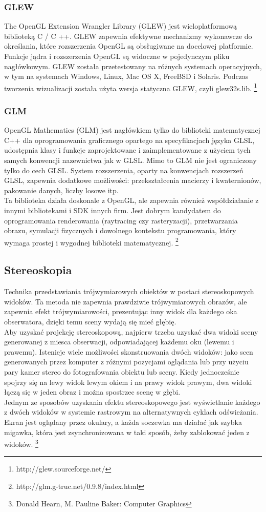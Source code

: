 \documentclass[paper=a4, fontsize=11pt]{scrartcl} %
\begin{document}
\subsubsection{GLEW}
The OpenGL Extension Wrangler Library (GLEW) jest wieloplatformową biblioteką C / C ++. GLEW zapewnia efektywne mechanizmy wykonawcze do określania, które rozszerzenia OpenGL są obsługiwane na docelowej platformie. Funkcje jądra i rozszerzenia OpenGL są widoczne w pojedynczym pliku nagłówkowym. GLEW została przetestowany na różnych systemach operacyjnych, w tym na systemach Windows, Linux, Mac OS X, FreeBSD i Solaris.
Podczas tworzenia wizualizacji została użyta wersja statyczna GLEW, czyli glew32s.lib. \footnote{http://glew.sourceforge.net/}

\subsubsection{GLM}
OpenGL Mathematics (GLM) jest nagłówkiem tylko do biblioteki matematycznej C++ dla oprogramowania graficznego opartego na specyfikacjach języka GLSL, udostępnia klasy i funkcje zaprojektowane i zaimplementowane z użyciem tych samych konwencji nazewnictwa jak w GLSL. Mimo to GLM nie jest ograniczony tylko do cech GLSL. System rozszerzenia, oparty na konwencjach rozszerzeń GLSL, zapewnia dodatkowe możliwości: przekształcenia macierzy i kwaternionów, pakowanie danych, liczby losowe itp. \\
Ta biblioteka działa doskonale z OpenGL, ale zapewnia również współdziałanie z innymi bibliotekami i SDK innych firm. Jest dobrym kandydatem do oprogramowania renderowania (raytracing czy rasteryzacji), przetwarzania obrazu, symulacji fizycznych i dowolnego kontekstu programowania, który wymaga prostej i wygodnej biblioteki matematycznej. 
\footnote{http://glm.g-truc.net/0.9.8/index.html}

\subsection{Stereoskopia}
Technika przedstawiania trójwymiarowych obiektów w postaci stereoskopowych widoków. Ta metoda nie zapewnia prawdziwie trójwymiarowych obrazów, ale zapewnia efekt trójwymiarowości, prezentując inny widok dla każdego oka obserwatora, dzięki temu sceny wydają się mieć głębię.\\
	Aby uzyskać projekcję stereoskopową, najpierw trzeba uzyskać dwa widoki sceny generowanej z miesca obserwacji, odpowiadającej każdemu oku (lewemu i prawemu). Istenieje wiele możliwości skonstruowania dwóch widoków: jako scen generowanych przez komputer z różnymi pozycjami oglądania lub przy użyciu pary kamer stereo do fotografowania obiektu lub sceny. Kiedy jednocześnie spojrzy się na lewy widok lewym okiem i na prawy widok prawym, dwa widoki łączą się w jeden obraz i można spostrzec scenę w głębi. \\ 
	Jednym ze sposobów uzyskania efektu stereoskopowego jest wyświetlanie każdego z dwóch widoków w systemie rastrowym na alternatywnych cyklach odświeżania. Ekran jest oglądany przez okulary, a każda soczewka ma działać jak szybka migawka, która jest zsynchronizowana w taki sposób, żeby zablokować jeden z widoków.
\footnote{Donald Hearn, M. Pauline Baker: Computer Graphics}
\end{document}
